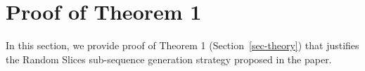 \documentclass[sigconf, anonymous]{acmart}
\newtheorem{thm}{Theorem}
\renewcommand{\P}{\mathbb{P}}
\begin{document}
\section{Proof of Theorem 1} \label{app-sec-proof}

In this section, we provide proof of Theorem 1 (Section~\ref{sec-theory}) that justifies the Random Slices sub-sequence generation strategy proposed in the paper.



\end{document}
